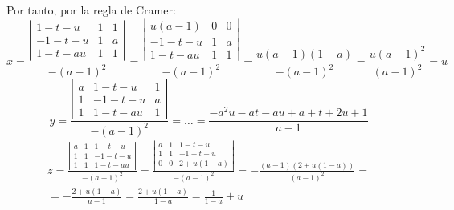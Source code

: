 \documentclass[12pt]{article}
\begin{document}
\begin{ejercicio}
\begin{itemize}
        Por tanto, por la regla de Cramer:
        \begin{equation*}
            x = \frac{\left|\begin{array}{ccc}
                1-t-u & 1 & 1 \\
                -1-t-u & 1 & a \\
                1-t-au & 1 & 1
            \end{array}\right|}{-(a-1)^2}
            = \frac{\left|\begin{array}{ccc}
                u(a-1) & 0 & 0 \\
                -1-t-u & 1 & a \\
                1-t-au & 1 & 1
            \end{array}\right|}{-(a-1)^2}
            = \frac{u(a-1)(1-a)}{-(a-1)^2} = \frac{u(a-1)^2}{(a-1)^2} = u
        \end{equation*}
        \begin{equation*}
            y = \frac{\left|\begin{array}{ccc}
                a & 1-t-u & 1 \\
                1 & -1-t-u & a \\
                1 & 1-t-au & 1
            \end{array}\right|}{-(a-1)^2} = \dots = \frac{-a^2u-at-au+a+t+2u+1}{a-1}
        \end{equation*}
        \begin{multline*}
            z = \frac{\left|\begin{array}{ccc}
                a & 1 & 1-t-u \\
                1 & 1 & -1-t-u \\
                1 & 1 & 1-t-au
            \end{array}\right|}{-(a-1)^2}
            = \frac{\left|\begin{array}{ccc}
                a & 1 & 1-t-u \\
                1 & 1 & -1-t-u \\
                0 & 0 & 2+u(1-a)
            \end{array}\right|}{-(a-1)^2}
            = -\frac{(a-1)(2+u(1-a))}{(a-1)^2}
            =\\= -\frac{2+u(1-a)}{a-1}
            = \frac{2+u(1-a)}{1-a} = \frac{1}{1-a} +u
        \end{multline*}
    \end{itemize}
\end{ejercicio}
\end{document}
